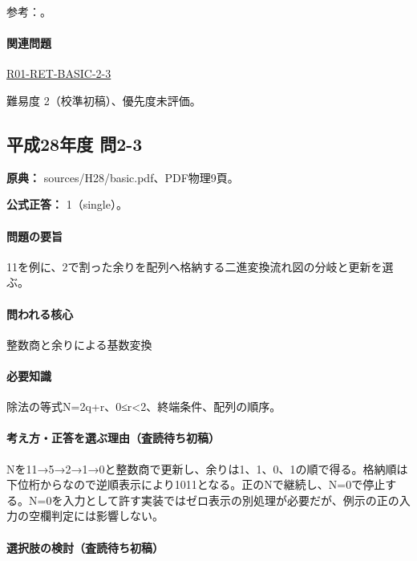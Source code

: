 \par 参考：\cite{nist_binary_prefix}。

\paragraph{関連問題} \hyperref[q:r01-ret-basic-2-3]{R01-RET-BASIC-2-3}

\par 難易度 2（校準初稿）、優先度未評価。

\subsection{平成28年度 問2-3}
\label{q:h28-reg-basic-2-3}

\noindent\textbf{原典：} sources/H28/basic.pdf、PDF物理9頁。

\textbf{公式正答：} 1（single）。

\paragraph{問題の要旨} 11を例に、2で割った余りを配列へ格納する二進変換流れ図の分岐と更新を選ぶ。

\paragraph{問われる核心} 整数商と余りによる基数変換

\paragraph{必要知識} 除法の等式N=\allowbreak{}2q+r、0≤r<2、終端条件、配列の順序。

\paragraph{考え方・正答を選ぶ理由（査読待ち初稿）} Nを11→5→2→1→0と整数商で更新し、余りは1、1、0、1の順で得る。格納順は下位桁からなので逆順表示により1011となる。正のNで継続し、N=\allowbreak{}0で停止する。N=\allowbreak{}0を入力として許す実装ではゼロ表示の別処理が必要だが、例示の正の入力の空欄判定には影響しない。

\paragraph{選択肢の検討（査読待ち初稿）}\mbox{}\par

